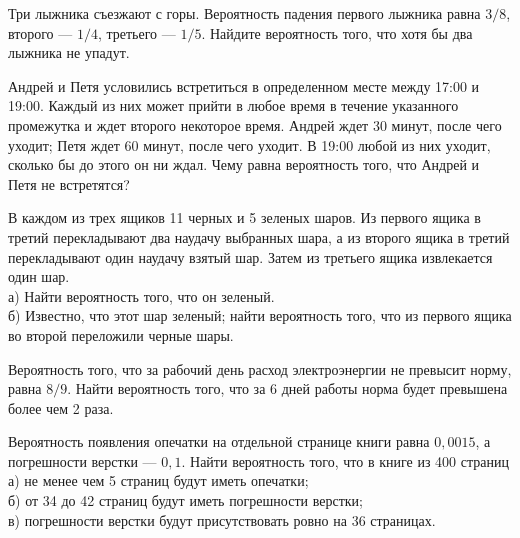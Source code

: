 \newpage\setcounter{zad}{0}



\begin{zkrW}{20}\noindent 
	Три лыжника съезжают с горы. Вероятность падения первого лыжника равна $3/8$, второго --- $1/4$, третьего --- $1/5$. Найдите вероятность того, что хотя бы два лыжника не упадут.
 
\end{zkrW}

\begin{zkrW}{20}\noindent 
	Андрей и Петя условились встретиться в определенном месте между 17:00 и 19:00. Каждый из них может прийти в любое время в течение указанного промежутка и ждет второго некоторое время. Андрей ждет 30 минут, после чего уходит; Петя ждет 60 минут, после чего уходит. В 19:00 любой из них уходит, сколько бы до этого он ни ждал. Чему равна вероятность того, что Андрей и Петя не встретятся?
 
\end{zkrW}

\begin{zkrW}{20}\noindent 
	В каждом из трех ящиков 11 черных и 5 зеленых шаров. Из первого ящика в третий перекладывают два наудачу выбранных шара, а из второго ящика в третий перекладывают один наудачу взятый шар. Затем из третьего ящика извлекается один шар. \\ \indent а) Найти вероятность того, что он зеленый. \\ \indent б) Известно, что этот шар зеленый; найти вероятность того, что из первого ящика во второй переложили черные шары.
 
\end{zkrW}

\begin{zkrW}{20}\noindent 
	Вероятность того, что за рабочий день расход электроэнергии не превысит норму, равна $8/9$. Найти вероятность того, что за 6 дней работы норма будет превышена более чем 2 раза.
 
\end{zkrW}

\begin{zkrW}{20}\noindent 
	Вероятность появления опечатки на отдельной странице книги равна $0{,}0015$, а погрешности верстки --- $0{,}1$. Найти вероятность того, что в книге из 400 страниц \\ \indent а) не менее чем 5 страниц будут иметь опечатки; \\ \indent б) от 34 до 42 страниц будут иметь погрешности верстки; \\ \indent в) погрешности верстки будут присутствовать ровно на 36 страницах.
 
\end{zkrW}

